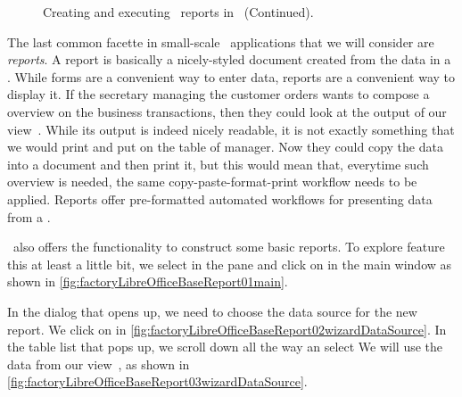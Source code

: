%
%
\begin{figure}%
\ContinuedFloat%
\centering%
%
%
%
\floatSep%
%
%
%
\floatRowSep%
%
%
%
\caption{Creating and executing \db\ reports in \libreofficeBase\ (Continued).}%
\label{fig:factoryLibreOfficeBaseReportE}%
\end{figure}%
%
%
The last common facette in small-scale \db\ applications that we will consider are \emph{reports}.
A report is basically a nicely-styled document created from the data in a \db.
While forms are a convenient way to enter data, reports are a convenient way to display it.
If the secretary managing the customer orders wants to compose a overview on the business transactions, then they could look at the output of our view~.
While its output is indeed nicely readable, it is not exactly something that we would print and put on the table of manager.
Now they could copy the data into a document and then print it, but this would mean that, everytime such overview is needed, the same copy-paste-format-print workflow needs to be applied.
Reports offer pre-formatted automated workflows for presenting data from a \db.

\libreofficeBase\ also offers the functionality to construct some basic reports.
To explore feature this at least a little bit, we select  in the  pane and click on  in the \libreofficeBase main window as shown in \cref{fig:factoryLibreOfficeBaseReport01main}.

In the dialog that opens up, we need to choose the data source for the new report.
We click on  in \cref{fig:factoryLibreOfficeBaseReport02wizardDataSource}.
In the table list that pops up, we scroll down all the way an select 
We will use the data from our view~, as shown in \cref{fig:factoryLibreOfficeBaseReport03wizardDataSource}.

